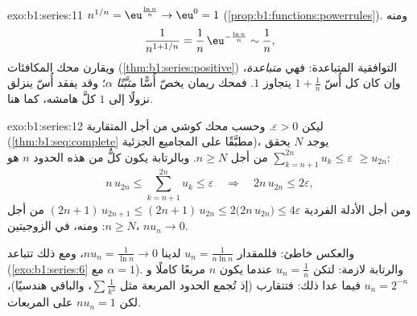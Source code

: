 \begin{solution}{exo:b1:series:11}
$n^{1/n} = \eu^{\frac{\ln n}{n}} \to \eu^0 = 1$
(\cref{prop:b1:functions:powerrules}). ومنه
\[
\frac{1}{n^{1 + 1/n}} = \frac{1}{n}\,\eu^{-\frac{\ln n}{n}}
\sim \frac{1}{n} ,
\]
ويقارن محك المكافئات (\cref{thm:b1:series:positive})
 التوافقية المتباعدة: فهي \emph{متباعدة}،
وإن كان كل أُسّ $1 + \frac1n$ يتجاوز $1$. فمحك ريمان
يخصّ أُسًّا \emph{مثبَّتًا} $\alpha$؛ وقد يفقد أُسّ
ينزلق نزولًا إلى $1$ كلَّ هامشه، كما هنا.
\end{solution}

\begin{solution}{exo:b1:series:12}
ليكن $\varepsilon > 0$. وحسب محك كوشي من أجل
 المتقاربة (\cref{thm:b1:seq:complete} مطبَّقًا على
المجاميع الجزئية)، يوجد $N$ يحقق $\sum_{k=n+1}^{2n} u_k \leq
\varepsilon$ من أجل $n \geq N$. وبالرتابة يكون كلٌّ من هذه الحدود $n$
هو $\geq u_{2n}$:
\[
n\,u_{2n} \leq \sum_{k=n+1}^{2n} u_k \leq \varepsilon
\quad\Longrightarrow\quad 2n\,u_{2n} \leq 2\varepsilon ,
\]
ومن أجل الأدلة الفردية $(2n+1)\,u_{2n+1} \leq (2n+1)\,u_{2n} \leq
2\bigl(2n\,u_{2n}\bigr) \leq 4\varepsilon$ من أجل $n \geq N$: ومنه، في
الزوجيتين، $n u_n \to 0$.

والعكس خاطئ: فللمقدار $u_n = \frac{1}{n\ln n}$ لدينا $n u_n =
\frac{1}{\ln n} \to 0$، ومع ذلك تتباعد 
(\cref{exo:b1:series:6} مع $\alpha = 1$). والرتابة لازمة:
لتكن $u_n = \frac1n$ عندما يكون $n$ مربعًا كاملًا و $u_n =
2^{-n}$ فيما عدا ذلك: فتتقارب  (إذ تُجمع الحدود المربعة
مثل $\sum \frac{1}{k^2}$، والباقي هندسيًا)، لكن $n u_n =
1$ على المربعات.
\end{solution}

